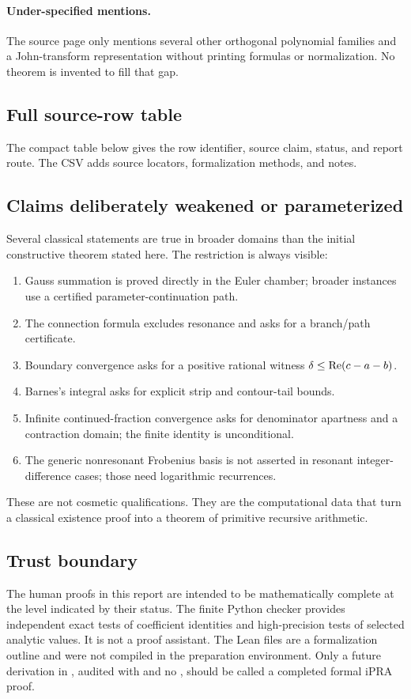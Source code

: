 \paragraph{Under-specified mentions.}
The source page only mentions several other orthogonal polynomial families and
a John-transform representation without printing formulas or normalization.
No theorem is invented to fill that gap.

\subsection{Full source-row table}

The compact table below gives the row identifier, source claim, status, and
report route.  The CSV adds source locators, formalization methods, and notes.

\begingroup\scriptsize
\setlength{\tabcolsep}{3pt}

\endgroup

\subsection{Claims deliberately weakened or parameterized}

Several classical statements are true in broader domains than the initial
constructive theorem stated here.  The restriction is always visible:
\begin{enumerate}
\item Gauss summation is proved directly in the Euler chamber; broader
instances use a certified parameter-continuation path.
\item The connection formula excludes resonance and asks for a branch/path
certificate.
\item Boundary convergence asks for a positive rational witness
\(\delta\le\operatorname{Re}(c-a-b)\).
\item Barnes's integral asks for explicit strip and contour-tail bounds.
\item Infinite continued-fraction convergence asks for denominator apartness
and a contraction domain; the finite identity is unconditional.
\item The generic nonresonant Frobenius basis is not asserted in resonant
integer-difference cases; those need logarithmic recurrences.
\end{enumerate}
These are not cosmetic qualifications.  They are the computational data that
turn a classical existence proof into a theorem of primitive recursive
arithmetic.

\subsection{Trust boundary}

The human proofs in this report are intended to be mathematically complete at
the level indicated by their status.  The finite Python checker provides
independent exact tests of coefficient identities and high-precision tests of
selected analytic values.  It is not a proof assistant.  The Lean files are a
formalization outline and were not compiled in the preparation environment.
Only a future derivation in , audited with
 and no , should be called a completed formal
iPRA proof.
